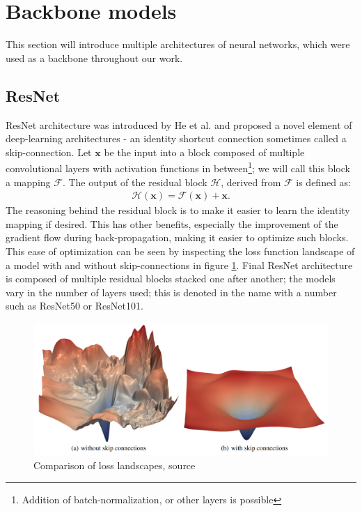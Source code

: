 \section{Backbone models}
This section will introduce multiple architectures of neural networks, which were used as a backbone throughout our work.
\subsection{ResNet}
ResNet architecture was introduced by He et al. \cite{He2015} and proposed a novel element of deep-learning architectures - an identity shortcut connection sometimes called a skip-connection. Let $\mathbf{x}$ be the input into a block composed of multiple convolutional layers with activation functions in between\footnote{Addition of batch-normalization, or other layers is possible}; we will call this block a mapping $\mathcal{F}$. The output of the residual block $\mathcal{H}$, derived from $\mathcal{F}$ is defined as:
\begin{align}
    \mathcal{H}\left(\mathbf{x}\right) = \mathcal{F} \left(\mathbf{x}\right) + \mathbf{x}.
\end{align}
The reasoning behind the residual block is to make it easier to learn the identity mapping if desired. This has other benefits, especially the improvement of the gradient flow during back-propagation, making it easier to optimize such blocks. This ease of optimization can be seen by inspecting the loss function landscape of a model with and without skip-connections in figure \ref{fig:resnet_loss}.
Final ResNet architecture is composed of multiple residual blocks stacked one after another; the models vary in the number of layers used; this is denoted in the name with a number such as ResNet50 or ResNet101.

\begin{figure}
    \centering
    \includegraphics[width=\linewidth]{images/resnet_loss.png}
    \caption{Comparison of loss landscapes, source \cite{Li2017}}
    \label{fig:resnet_loss}
\end{figure}

